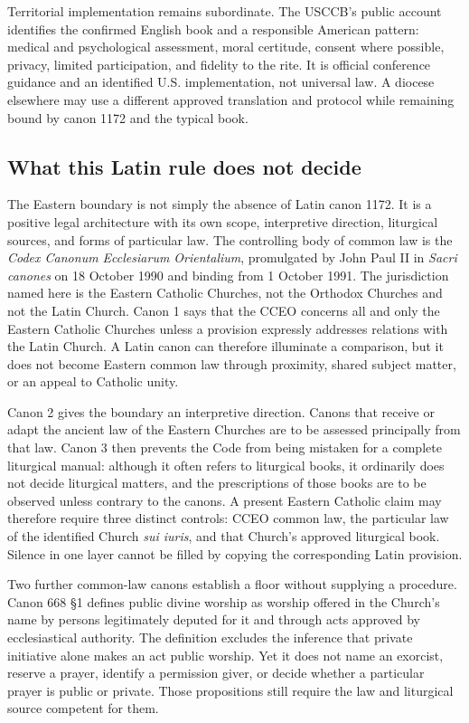 Territorial implementation remains subordinate. The USCCB's public account
identifies the confirmed English book and a responsible American pattern:
medical and psychological assessment, moral certitude, consent where possible,
privacy, limited participation, and fidelity to the rite. It is official
conference guidance and an identified U.S. implementation, not universal law.
A diocese elsewhere may use a different approved translation and protocol
while remaining bound by canon 1172 and the typical book.

\subsection{What this Latin rule does not decide}

The Eastern boundary is not simply the absence of Latin canon 1172. It is a
positive legal architecture with its own scope, interpretive direction,
liturgical sources, and forms of particular law. The controlling body of
common law is the \emph{Codex Canonum Ecclesiarum Orientalium}, promulgated by
John Paul II in \emph{Sacri canones} on 18 October 1990 and binding from
1 October 1991. The jurisdiction named here is the Eastern Catholic Churches,
not the Orthodox Churches and not the Latin Church. Canon 1 says that the CCEO
concerns all and only the Eastern Catholic Churches unless a provision
expressly addresses relations with the Latin Church. A Latin canon can
therefore illuminate a comparison, but it does not become Eastern common law
through proximity, shared subject matter, or an appeal to Catholic unity.

Canon 2 gives the boundary an interpretive direction. Canons that receive or
adapt the ancient law of the Eastern Churches are to be assessed principally
from that law. Canon 3 then prevents the Code from being mistaken for a
complete liturgical manual: although it often refers to liturgical books, it
ordinarily does not decide liturgical matters, and the prescriptions of those
books are to be observed unless contrary to the canons. A present Eastern
Catholic claim may therefore require three distinct controls: CCEO common law,
the particular law of the identified Church \emph{sui iuris}, and that
Church's approved liturgical book. Silence in one layer cannot be filled by
copying the corresponding Latin provision.

Two further common-law canons establish a floor without supplying a procedure.
Canon 668 \S1 defines public divine worship as worship offered in the Church's
name by persons legitimately deputed for it and through acts approved by
ecclesiastical authority. The definition excludes the inference that private
initiative alone makes an act public worship. Yet it does not name an
exorcist, reserve a prayer, identify a permission giver, or decide whether a
particular prayer is public or private. Those propositions still require the
law and liturgical source competent for them.

